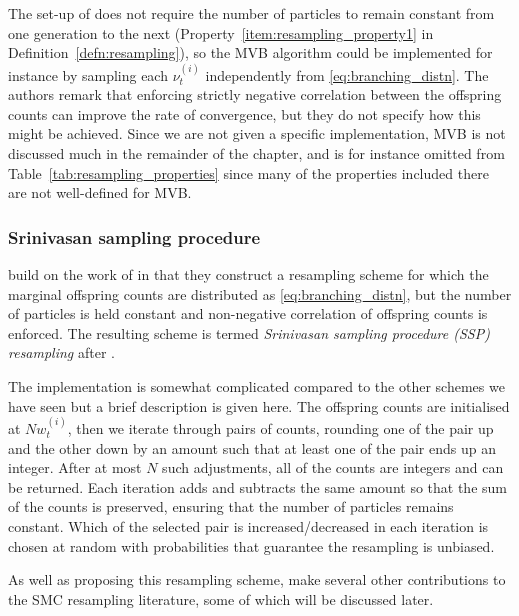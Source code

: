The set-up of \textcite{crisan1999} does not require the number of particles to remain constant from one generation to the next (Property~\ref{item:resampling_property1} in Definition~\ref{defn:resampling}), so the MVB algorithm could be implemented for instance by sampling each $\nu_t^{(i)}$ independently from \eqref{eq:branching_distn}. The authors remark that enforcing strictly negative correlation between the offspring counts can improve the rate of convergence, but they do not specify how this might be achieved.
Since we are not given a specific implementation, MVB is not discussed much in the remainder of the chapter, and is for instance omitted from Table~\ref{tab:resampling_properties} since many of the properties included there are not well-defined for MVB.



\subsubsection{Srinivasan sampling procedure}
\textcite{gerber2017} build on the work of \textcite{crisan1999} in that they construct a resampling scheme for which the marginal offspring counts are distributed as \eqref{eq:branching_distn}, but the number of particles is held constant and non-negative correlation of offspring counts is enforced. The resulting scheme is termed \emph{Srinivasan sampling procedure (SSP) resampling} after \textcite{srinivasan2001}.

The implementation is somewhat complicated compared to the other schemes we have seen \parencite[for full details see][Algorithm~1]{gerber2017} but a brief description is given here.
The offspring counts are initialised at $Nw_t^{(i)}$, then we iterate through pairs of counts, rounding one of the pair up and the other down by an amount such that at least one of the pair ends up an integer. After at most $N$ such adjustments, all of the counts are integers and can be returned. Each iteration adds and subtracts the same amount so that the sum of the counts is preserved, ensuring that the number of particles remains constant. Which of the selected pair is increased/decreased in each iteration is chosen at random with probabilities that guarantee the resampling is unbiased.

As well as proposing this resampling scheme, \textcite{gerber2017} make several other contributions to the SMC resampling literature, some of which will be discussed later.


